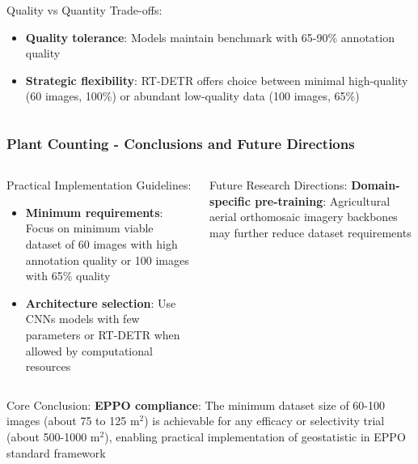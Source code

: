 \documentclass[aspectratio=43]{beamer}
\begin{document}
\begin{frame}
\begin{columns}
        \begin{column}{0.5\textwidth}
            \begin{block}{Quality vs Quantity Trade-offs:}
                \scriptsize
                \begin{itemize}
                    \item \textbf{Quality tolerance}: Models maintain benchmark with 65-90\% annotation quality
                    \item \textbf{Strategic flexibility}: RT-DETR offers choice between minimal high-quality (60 images, 100\%) or abundant low-quality data (100 images, 65\%)
                \end{itemize}
            \end{block}
        \end{column}
    \end{columns}
    \end{frame}

\begin{frame}
    \frametitle{Plant Counting - Conclusions and Future Directions}
    \begin{columns}
        \begin{column}{0.5\textwidth}
            \begin{exampleblock}{Practical Implementation Guidelines:}
                \scriptsize
                \begin{itemize}
                    \item \textbf{Minimum requirements}: Focus on minimum viable dataset of 60 images with high annotation quality or 100 images with 65\% quality
                    \item \textbf{Architecture selection}: Use CNNs models with few parameters or RT-DETR when allowed by computational resources 
                \end{itemize}
            \end{exampleblock}
        \end{column}
        \begin{column}{0.5\textwidth}
            \begin{block}{Future Research Directions:}
                \scriptsize
                \textbf{Domain-specific pre-training}: Agricultural aerial orthomosaic imagery backbones may further reduce dataset requirements
            \end{block}
        \end{column}
    \end{columns}
    
    \begin{alertblock}{Core Conclusion:}
        \scriptsize
        \textbf{EPPO compliance}: The minimum dataset size of 60-100 images (about 75 to 125 m$^2$) is achievable for any efficacy or selectivity trial (about 500-1000 m$^2$), enabling practical implementation of geostatistic in EPPO standard framework
    \end{alertblock}
\end{frame}
\end{document}
